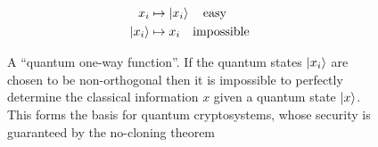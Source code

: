 \begin{figure}[h!]
\centering
\captionsetup{width=0.8\linewidth}
\begin{framed}
\begin{align*}
x_i &\mapsto \ket{x_i} \qq{easy}\\
\ket{x_i} &\mapsto x_i \qq{impossible}
\end{align*}
\caption{A ``quantum one-way function''. If the quantum states $\ket{x_i}$ are chosen to be non-orthogonal then it is impossible to perfectly determine the classical information $x$ given a quantum state $\ket{x}$. This forms the basis for quantum cryptosystems, whose security is guaranteed by the no-cloning theorem}
\label{fig:qutrapdoor}
\end{framed}
\end{figure}

\clearpage







